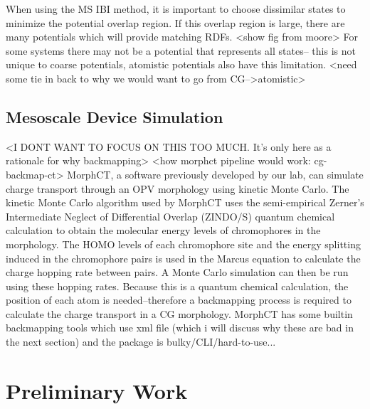 When using the MS IBI method, it is important to choose dissimilar states to minimize the potential overlap region.
If this overlap region is large, there are many potentials which will provide matching RDFs. <show fig from moore>
For some systems there may not be a potential that represents all states-- this is not unique to coarse potentials, atomistic potentials also have this limitation.
<need some tie in back to why we would want to go from CG-->atomistic>

\subsection*{Mesoscale Device Simulation}
<I DONT WANT TO FOCUS ON THIS TOO MUCH. It's only here as a rationale for why backmapping>
<how morphct pipeline would work: cg-backmap-ct>
MorphCT, a software previously developed by our lab, can simulate charge transport through an OPV morphology using kinetic Monte Carlo\cite{Miller2018a,MorphCT,morphct2.2}.
The kinetic Monte Carlo algorithm used by MorphCT uses the semi-empirical Zerner's Intermediate Neglect of Differential Overlap (ZINDO/S) quantum chemical calculation to obtain the molecular energy levels of chromophores in the morphology.
The HOMO levels of each chromophore site and the energy splitting induced in the chromophore pairs is used in the Marcus equation to calculate the charge hopping rate between pairs.
A Monte Carlo simulation can then be run using these hopping rates.
Because this is a quantum chemical calculation, the position of each atom is needed--therefore a backmapping process is required to calculate the charge transport in a CG morphology.
MorphCT has some builtin backmapping tools which use xml file (which i will discuss why these are bad in the next section) and the package is bulky/CLI/hard-to-use...

\section*{Preliminary Work}


